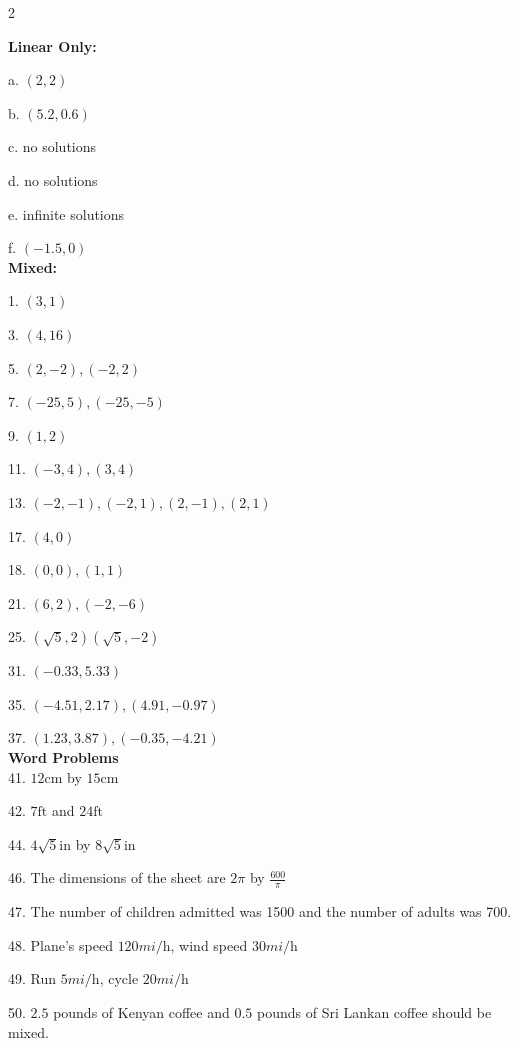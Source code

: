 \columnsep =30pt
\begin {multicols}{2}

\textbf{Linear Only:}

a. $\left (2 ,2\right )$ 

b. $\left (5.2 ,0.6\right )$

c. no solutions

d. no solutions

e. infinite solutions

f. $\left (-1.5 ,0\right )$\\
\break
\textbf{Mixed:}

1. $\left (3 ,1\right )$ 

3. $\left (4 ,16\right )$ 

5. $\left (2 , -2\right ) ,\left ( -2 ,2\right )$ 

7. $\left ( -25 ,5\right ) ,\left ( -25 , -5\right )$ 

9. $\left (1 ,2\right )$ 

11. $\left ( -3 ,4\right ) ,\left (3 ,4\right )$ 

13. $\left ( -2 , -1\right ) ,\left ( -2 ,1\right ) ,\left (2 , -1\right ) ,\left (2 ,1\right )$ 

17. $\left (4 ,0\right )$ 

18. $\left (0 ,0\right ) ,\left (1 ,1\right )$ 

21. $\left (6 ,2\right ) ,\left ( -2 , -6\right )$ 

25. $\left (\sqrt{5} ,2\right )\left (\sqrt{5} , -2\right )$ 

31. $\left ( -0.33 ,5.33\right )$ 

35. $\left ( -4.51 ,2.17\right ) ,\left (4.91 , -0.97\right )$ 

37. $\left (1.23 ,3.87\right ) ,\left ( -0.35 , -4.21\right )$ \\
\break
\textbf{Word Problems}\\

41. $12 \mbox{cm}$ by $15 \mbox{cm}$ 

42. $7 \mbox{ft}$ and $24 \mbox{ft}$ 

44. $4 \sqrt{5} \mbox{in}$ by $8 \sqrt{5} \mbox{in}$ 

46. The dimensions of the sheet are $2 \pi $ by $\frac{600}{\pi }$  

47. The number of children admitted was 1500 and the number
of adults was 700. 

48. Plane's speed $120 mi/\mbox{h}$, wind speed $30 mi/\mbox{h}$ 

49. Run $5 mi/\mbox{h}$, cycle $20 mi/\mbox{h}$ 

50. $2.5$ pounds of Kenyan coffee and $0.5$ pounds of Sri Lankan coffee should be mixed. 

\end {multicols}

